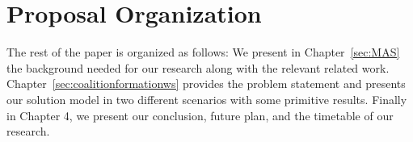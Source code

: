 \section{Proposal Organization}\label{sec:outline}
The rest of the paper is organized as follows: We present in Chapter~\ref{sec:MAS} the background
needed for our research along with the relevant related work. Chapter~\ref{sec:coalitionformationws} provides the problem statement and presents our solution model in two
different scenarios with some primitive results. Finally in Chapter 4, we present our conclusion, future plan, and the timetable of our research.

